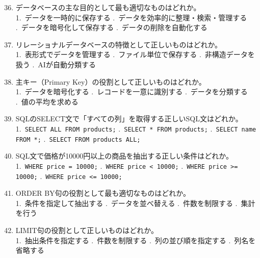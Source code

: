 \documentclass[b4paper,7pt,twocolumn,landscape]{jsarticle}
\begin{document}
\begin{enumerate}
\setcounter{enumi}{35}
\item データベースの主な目的として最も適切なものはどれか。\\
1.~データを一時的に保存する .~データを効率的に整理・検索・管理する .~データを暗号化して保存する .~データの削除を自動化する

\item リレーショナルデータベースの特徴として正しいものはどれか。\\
1.~表形式でデータを管理する .~ファイル単位で保存する .~非構造データを扱う .~AIが自動分類する

\item 主キー（Primary Key）の役割として正しいものはどれか。\\
1.~データを暗号化する .~レコードを一意に識別する .~データを分類する .~値の平均を求める

\item SQLのSELECT文で「すべての列」を取得する正しいSQL文はどれか。\\
1.~\texttt{SELECT ALL FROM products;} .~\texttt{SELECT * FROM products;} .~\texttt{SELECT name FROM *;} .~\texttt{SELECT FROM products ALL;}

\item SQL文で価格が10000円以上の商品を抽出する正しい条件はどれか。\\
1.~\texttt{WHERE price = 10000;} .~\texttt{WHERE price < 10000;} .~\texttt{WHERE price >= 10000;} .~\texttt{WHERE price <= 10000;}

\newpage

\item ORDER BY句の役割として最も適切なものはどれか。\\
1.~条件を指定して抽出する .~データを並べ替える .~件数を制限する .~集計を行う

\item LIMIT句の役割として正しいものはどれか。\\
1.~抽出条件を指定する .~件数を制限する .~列の並び順を指定する .~列名を省略する
\end{enumerate}
\end{document}
